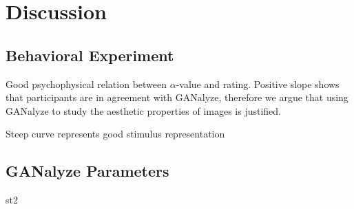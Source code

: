 \documentclass[../main.tex]{subfiles}
\begin{document}
\section{Discussion}

	\subsection{Behavioral Experiment}
	Good psychophysical relation between $\alpha$-value and rating. Positive slope shows that participants are in agreement with GANalyze, therefore we argue that using GANalyze to study the aesthetic properties of images is justified.
	
	Steep curve represents good stimulus representation

	\subsection{GANalyze Parameters}
	st2
\end{document}
